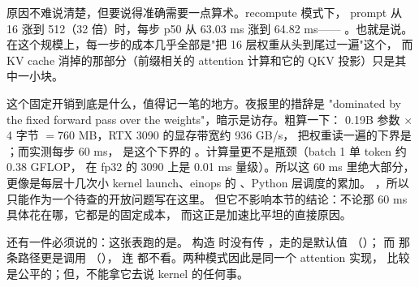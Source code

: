 原因不难说清楚，但要说得准确需要一点算术。recompute 模式下，
prompt 从 16 涨到 512（32 倍）时，每步 p50 从 63.03 ms 涨到 64.82 ms——
。也就是说。
在这个规模上，每一步的成本几乎全部是"把 16 层权重从头到尾过一遍"这个，
而 KV cache 消掉的那部分（前缀相关的 attention 计算和它的 QKV 投影）只是其中一小块。

这个固定开销到底是什么，值得记一笔的地方。夜报里的措辞是
"dominated by the fixed forward pass over the weights"，暗示是访存。粗算一下：
0.19B 参数 $\times$ 4 字节 $= 760$ MB，RTX 3090 的显存带宽约 936 GB/s，
把权重读一遍的下界是 ；而实测每步 60 ms，
是这个下界的 。计算量更不是瓶颈（batch 1 单 token 约 0.38 GFLOP，
在 fp32 的 3090 上是 0.01 ms 量级）。所以这 60 ms 里绝大部分，
更像是每层十几次小 kernel launch、einops 的 、Python 层调度的累加。
，所以只能作为一个待查的开放问题写在这里。
但它不影响本节的结论：不论那 60 ms 具体花在哪，它都是的固定成本，
而这正是加速比平坦的直接原因。

还有一件必须说的：这张表跑的是。
 构造  时没有传
，走的是默认值 
（）；
而  那条路径更是调用
（），
连  都不看。两种模式因此是同一个 attention 实现，
比较是公平的；但，不能拿它去说 kernel 的任何事。

